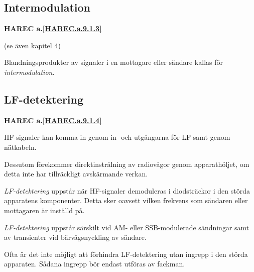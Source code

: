 \subsection{Intermodulation}
\textbf{
HAREC a.\ref{HAREC.a.9.1.3}\label{myHAREC.a.9.1.3}
}

(se även kapitel 4)

Blandningsprodukter av signaler i en mottagare eller sändare kallas
för \emph{intermodulation}.

\subsection{LF-detektering}
\textbf{
HAREC a.\ref{HAREC.a.9.1.4}\label{myHAREC.a.9.1.4}
}

HF-signaler kan komma in genom in- och utgångarna för LF samt genom nätkabeln.

Dessutom förekommer direktinstrålning av radiovågor genom apparathöljet, om
detta inte har tillräckligt avskärmande verkan.

\emph{LF-detektering} uppstår när HF-signaler demoduleras i diodsträckor i den
störda apparatens komponenter. Detta sker oavsett vilken frekvens som sändaren
eller mottagaren är inställd på.

\emph{LF-detektering} uppstår särskilt vid AM- eller SSB-modulerade sändningar
samt av transienter vid bärvågsnyckling av sändare.

Ofta är det inte möjligt att förhindra LF-detektering utan ingrepp i den störda
apparaten. Sådana ingrepp bör endast utföras av fackman.
